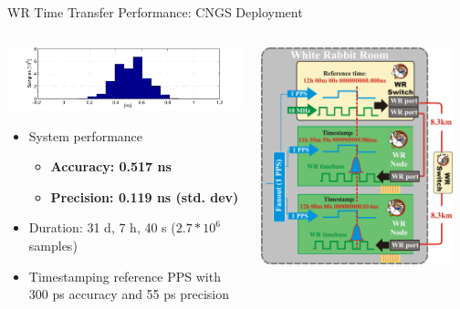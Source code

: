 \documentclass[compress,red]{beamer}
\begin{document}
\begin{frame}{WR Time Transfer Performance: CNGS Deployment}

  \begin{columns}[c]
	  \begin{center}

		\hspace{-1cm}
		\includegraphics[width=1.1\textwidth]{measurements/histogram-small.pdf}
		\begin{itemize}
		       \item System performance
		       \begin{itemize}
		         	\item \textbf{Accuracy: 0.517 ns}
			      \item \textbf{Precision: 0.119 ns (std. dev)}
		\end{itemize}			  
		       \item Duration: 31 d, 7 h, 40 s ($2.7*10^6$ samples)
		       \item Timestamping reference PPS with 300 ps accuracy and 55 ps precision
		\end{itemize}			


	  \end{center}
		\begin{center}
		\includegraphics[width=0.93\textwidth]{measurements/performance_testing_setup-detail_v2.pdf}
		\end{center}
  \end{columns}
\end{frame}
\end{document}
